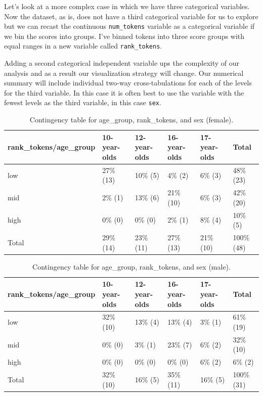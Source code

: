 \documentclass[
  letterpaper,
]{latex/krantz}
\begin{document}
Let's look at a more complex case in which we have three categorical
variables. Now the dataset, as is, does not have a third categorical
variable for us to explore but we can recast the continuous
\texttt{num\_tokens} variable as a categorical variable if we bin the
scores into groups. I've binned tokens into three score groups with
equal ranges in a new variable called \texttt{rank\_tokens}.

Adding a second categorical independent variable ups the complexity of
our analysis and as a result our visualization strategy will change. Our
numerical summary will include individual two-way cross-tabulations for
each of the levels for the third variable. In this case it is often best
to use the variable with the fewest levels as the third variable, in
this case \texttt{sex}.

\hypertarget{tbl-summaries-multivariate-categorical-table-belc-female}{}
\begin{table}
\caption{\label{tbl-summaries-multivariate-categorical-table-belc-female}Contingency table for age\_group, rank\_tokens, and sex (female). }\tabularnewline

\centering
\begin{tabular}{llllll}
\toprule
rank\_tokens/age\_group & 10-year-olds & 12-year-olds & 16-year-olds & 17-year-olds & Total\\
\midrule
low & 27\% (13) & 10\%  (5) & 4\%  (2) & 6\%  (3) & 48\% (23)\\
mid & 2\%  (1) & 13\%  (6) & 21\% (10) & 6\%  (3) & 42\% (20)\\
high & 0\%  (0) & 0\%  (0) & 2\%  (1) & 8\%  (4) & 10\%  (5)\\
Total & 29\% (14) & 23\% (11) & 27\% (13) & 21\% (10) & 100\% (48)\\
\bottomrule
\end{tabular}
\end{table}

\hypertarget{tbl-summaries-multivariate-categorical-table-belc-male}{}
\begin{table}
\caption{\label{tbl-summaries-multivariate-categorical-table-belc-male}Contingency table for age\_group, rank\_tokens, and sex (male). }\tabularnewline

\centering
\begin{tabular}{llllll}
\toprule
rank\_tokens/age\_group & 10-year-olds & 12-year-olds & 16-year-olds & 17-year-olds & Total\\
\midrule
low & 32\% (10) & 13\% (4) & 13\%  (4) & 3\% (1) & 61\% (19)\\
mid & 0\%  (0) & 3\% (1) & 23\%  (7) & 6\% (2) & 32\% (10)\\
high & 0\%  (0) & 0\% (0) & 0\%  (0) & 6\% (2) & 6\%  (2)\\
Total & 32\% (10) & 16\% (5) & 35\% (11) & 16\% (5) & 100\% (31)\\
\bottomrule
\end{tabular}
\end{table}
\end{document}

